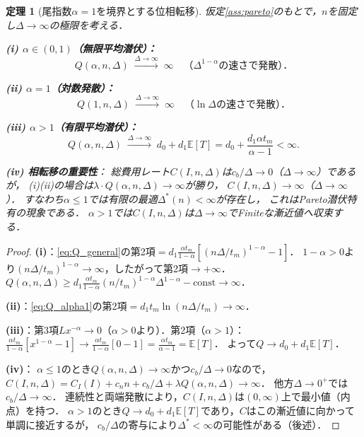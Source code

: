 \documentclass[12pt,a4paper]{article}
\theoremstyle{plain}
\newtheorem{theorem}{定理}[section]
\theoremstyle{definition}
\theoremstyle{remark}
\newcommand{\E}{\mathbb{E}}
\newcommand{\Dopt}{\Delta^*}
\begin{document}
\begin{theorem}[尾指数$\alpha=1$を境界とする位相転移]\label{thm:phase}
仮定\ref{ass:pareto}のもとで，$n$を固定し$\Delta\to\infty$の極限を考える．

\noindent\textbf{(i) $\alpha\in(0,1)$（無限平均潜伏）：}
\begin{equation}\label{eq:diverge}
  Q(\alpha,n,\Delta)\;\xrightarrow{\Delta\to\infty}\;\infty
  \quad\text{（$\Delta^{1-\alpha}$の速さで発散）．}
\end{equation}

\noindent\textbf{(ii) $\alpha=1$（対数発散）：}
\begin{equation}\label{eq:log_diverge}
  Q(1,n,\Delta)\;\xrightarrow{\Delta\to\infty}\;\infty
  \quad\text{（$\ln\Delta$の速さで発散）．}
\end{equation}

\noindent\textbf{(iii) $\alpha>1$（有限平均潜伏）：}
\begin{equation}\label{eq:converge}
  Q(\alpha,n,\Delta)\;\xrightarrow{\Delta\to\infty}\;d_0+d_1\E[T]
  =d_0+\frac{d_1\alpha t_m}{\alpha-1}<\infty.
\end{equation}

\noindent\textbf{(iv) 相転移の重要性}：
総費用レート$C(I,n,\Delta)$は$c_b/\Delta\to0$（$\Delta\to\infty$）であるが，
(i)(ii)の場合は$\lambda\cdot Q(\alpha,n,\Delta)\to\infty$が勝り，
$C(I,n,\Delta)\to\infty$（$\Delta\to\infty$）．
すなわち$\alpha\le1$では有限の最適$\Dopt(n)<\infty$が存在し，
これはPareto潜伏特有の現象である．
$\alpha>1$では$C(I,n,\Delta)$は$\Delta\to\infty$でFiniteな漸近値へ収束する．
\end{theorem}

\begin{proof}
\textbf{(i)}：\eqref{eq:Q_general}の第2項$=d_1\frac{\alpha t_m}{1-\alpha}[(n\Delta/t_m)^{1-\alpha}-1]$．
$1-\alpha>0$より$(n\Delta/t_m)^{1-\alpha}\to\infty$，したがって第2項$\to+\infty$．
$Q(\alpha,n,\Delta)\ge d_1\frac{\alpha t_m}{1-\alpha}(n/t_m)^{1-\alpha}\Delta^{1-\alpha}-\mathrm{const}\to\infty$．

\textbf{(ii)}：\eqref{eq:Q_alpha1}の第2項$=d_1 t_m\ln(n\Delta/t_m)\to\infty$．

\textbf{(iii)}：第3項$L x^{-\alpha}\to0$（$\alpha>0$より）．第2項（$\alpha>1$）：
$\frac{\alpha t_m}{1-\alpha}[x^{1-\alpha}-1]\to\frac{\alpha t_m}{1-\alpha}[0-1]=\frac{\alpha t_m}{\alpha-1}=\E[T]$．
よって$Q\to d_0+d_1\E[T]$．

\textbf{(iv)}：
$\alpha\le1$のとき$Q(\alpha,n,\Delta)\to\infty$かつ$c_b/\Delta\to0$なので，
$C(I,n,\Delta)=C_I(I)+c_n n+c_b/\Delta+\lambda Q(\alpha,n,\Delta)\to\infty$．
他方$\Delta\to0^+$では$c_b/\Delta\to\infty$．
連続性と両端発散により，$C(I,n,\Delta)$は$(0,\infty)$上で最小値（内点）を持つ．
$\alpha>1$のとき$Q\to d_0+d_1\E[T]$であり，$C$はこの漸近値に向かって単調に接近するが，
$c_b/\Delta$の寄与により$\Dopt<\infty$の可能性がある（後述）．
\end{proof}
\end{document}
